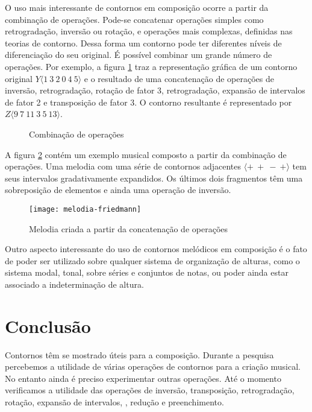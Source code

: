 O uso mais interessante de contornos em composição ocorre a partir da
combinação de operações. Pode-se concatenar operações simples como
retrogradação, inversão ou rotação, e operações mais complexas,
definidas nas teorias de contorno. Dessa forma um contorno pode ter
diferentes níveis de diferenciação do seu original. É possível
combinar um grande número de operações. Por exemplo, a figura
\ref{fig:combinacao-operacoes} traz a representação gráfica de um
contorno original $Y\langle1\:3\:2\:0\:4\:5\rangle$ e o resultado de
uma concatenação de operações de inversão, retrogradação, rotação de
fator 3, retrogradação, expansão de intervalos de fator 2 e
transposição de fator 3. O contorno resultante é representado por
$Z\langle9\:7\:11\:3\:5\:13\rangle$.

\begin{figure}
  \centering
  \caption{Combinação de operações}
  \label{fig:combinacao-operacoes}
\end{figure}

A figura \ref{fig:melodia-concatenacao-operacoes} contém um exemplo
musical composto a partir da combinação de operações. Uma melodia com
uma série de contornos adjacentes 
$\langle+\:+\:-\:+\rangle$ tem seus intervalos gradativamente
expandidos. Os últimos dois fragmentos têm uma sobreposição de
elementos e ainda uma operação de inversão.

\begin{figure}
  \centering
  \texttt{[image: melodia-friedmann]}
  \caption{Melodia criada a partir da concatenação de operações}
  \label{fig:melodia-concatenacao-operacoes}
\end{figure}

Outro aspecto interessante do uso de contornos melódicos em composição
é o fato de poder ser utilizado sobre qualquer sistema de organização
de alturas, como o sistema modal, tonal, sobre séries e conjuntos de
notas, ou poder ainda estar associado a indeterminação de altura.

\section{Conclusão}
\label{sec:conclusao}

Contornos têm se mostrado úteis para a composição. Durante a pesquisa
percebemos a utilidade de várias operações de contornos para a criação
musical. No entanto ainda é preciso experimentar outras operações. Até
o momento verificamos a utilidade das operações de inversão,
transposição, retrogradação, rotação, expansão de intervalos,
, redução e preenchimento.

